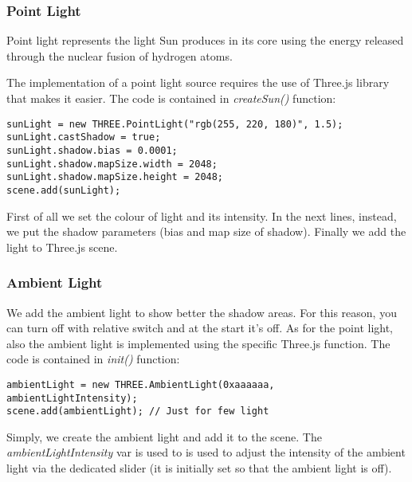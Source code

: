 \documentclass{article}
\begin{document}
\subsubsection{Point Light}\label{subsec:pointlight}
Point light represents the light Sun produces in its core using the energy released through the nuclear fusion of hydrogen atoms\cite{solarcore:wikipedia}.
\par The implementation of a point light source requires the use of Three.js library that makes it easier\cite{documentation:threejs}. The code is contained in \textit{createSun()} function:
\begin{lstlisting}
sunLight = new THREE.PointLight("rgb(255, 220, 180)", 1.5);
sunLight.castShadow = true;
sunLight.shadow.bias = 0.0001;
sunLight.shadow.mapSize.width = 2048;
sunLight.shadow.mapSize.height = 2048;
scene.add(sunLight);
\end{lstlisting}
First of all we set the colour of light and its intensity. In the next lines, instead, we put the shadow parameters (bias and map size of shadow). Finally we add the light to Three.js scene.

\subsubsection{Ambient Light}
We add the ambient light to show better the shadow areas. For this reason, you can turn off with relative switch and at the start it's off. As for the point light, also the ambient light is implemented using the specific Three.js function\cite{documentation:threejs}. The code is contained in \textit{init()} function:
\begin{lstlisting}
ambientLight = new THREE.AmbientLight(0xaaaaaa, ambientLightIntensity);
scene.add(ambientLight); // Just for few light
\end{lstlisting}
Simply, we create the ambient light and add it to the scene. The \textit{ambientLightIntensity} var is used to is used to adjust the intensity of the ambient light via the dedicated slider (it is initially set so that the ambient light is off).
\end{document}
